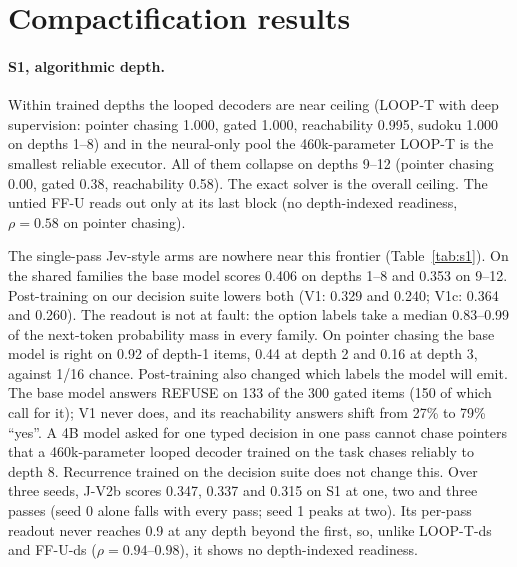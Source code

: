 \documentclass[11pt]{article}
\begin{document}
\section{Compactification results}
\label{sec:compact}

\begin{table}[t]
\centering
\small

\caption{S1 on the four families every arm shares (25 items per depth; sudoku4 depths 1--3).
Params are resident parameters including the host; passes are sequential forward passes per
decision. Reliable: by the registered rule in the all-arm pool (all) or in the neural-only pool
(neural). Generated from the run records by \texttt{scripts/xbench\_paper.py}.}
\label{tab:s1}
\end{table}

\paragraph{S1, algorithmic depth.} Within trained depths the looped decoders are near ceiling
(LOOP-T with deep supervision: pointer chasing 1.000, gated 1.000, reachability 0.995, sudoku 1.000
on depths 1--8) and in the neural-only pool the 460k-parameter LOOP-T is the smallest reliable
executor. All of them collapse on depths 9--12 (pointer chasing 0.00, gated 0.38, reachability 0.58).
The exact solver is the overall ceiling. The untied FF-U reads out only at its last block (no
depth-indexed readiness, $\rho=0.58$ on pointer chasing).

The single-pass Jev-style arms are nowhere near this frontier (Table~\ref{tab:s1}). On the shared
families the base model scores 0.406 on depths 1--8 and 0.353 on 9--12. Post-training on our
decision suite lowers both (V1: 0.329 and 0.240; V1c: 0.364 and 0.260). The readout is not at
fault: the option labels take a median 0.83--0.99 of the next-token probability mass in every
family. On pointer chasing the base model is right on 0.92 of depth-1 items, 0.44 at depth 2 and
0.16 at depth 3, against 1/16 chance. Post-training also changed which labels the model will
emit. The base model answers REFUSE on 133 of the 300 gated items (150 of which call for it); V1
never does, and its reachability answers shift from 27\% to 79\% ``yes''. A 4B model asked for one
typed decision in one pass cannot chase pointers that a 460k-parameter looped decoder trained on
the task chases reliably to depth 8. Recurrence trained on the decision suite does not change
this. Over three seeds, J-V2b scores 0.347, 0.337 and 0.315 on S1 at one, two and three passes
(seed 0 alone falls with every pass; seed 1 peaks at two). Its per-pass readout never reaches 0.9
at any depth beyond the first, so, unlike LOOP-T-ds and FF-U-ds ($\rho=0.94$--$0.98$), it shows
no depth-indexed readiness.
\end{document}
